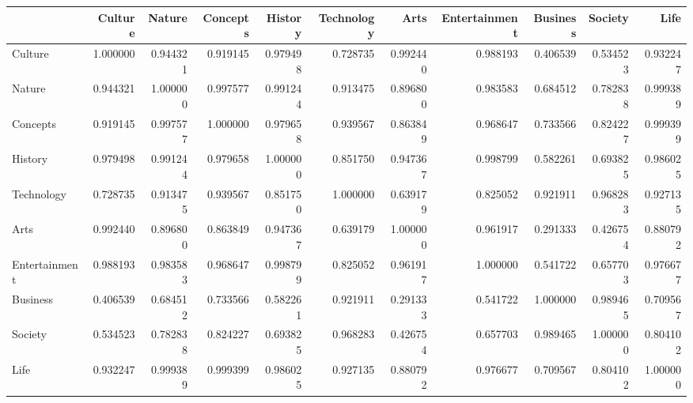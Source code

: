 \begin{tabular}{lrrrrrrrrrr}
\toprule
{} &   Culture &    Nature &  Concepts &   History &  Technology &      Arts &  Entertainment &  Business &   Society &      Life \\
\midrule
Culture       &  1.000000 &  0.944321 &  0.919145 &  0.979498 &    0.728735 &  0.992440 &       0.988193 &  0.406539 &  0.534523 &  0.932247 \\
Nature        &  0.944321 &  1.000000 &  0.997577 &  0.991244 &    0.913475 &  0.896800 &       0.983583 &  0.684512 &  0.782838 &  0.999389 \\
Concepts      &  0.919145 &  0.997577 &  1.000000 &  0.979658 &    0.939567 &  0.863849 &       0.968647 &  0.733566 &  0.824227 &  0.999399 \\
History       &  0.979498 &  0.991244 &  0.979658 &  1.000000 &    0.851750 &  0.947367 &       0.998799 &  0.582261 &  0.693825 &  0.986025 \\
Technology    &  0.728735 &  0.913475 &  0.939567 &  0.851750 &    1.000000 &  0.639179 &       0.825052 &  0.921911 &  0.968283 &  0.927135 \\
Arts          &  0.992440 &  0.896800 &  0.863849 &  0.947367 &    0.639179 &  1.000000 &       0.961917 &  0.291333 &  0.426754 &  0.880792 \\
Entertainment &  0.988193 &  0.983583 &  0.968647 &  0.998799 &    0.825052 &  0.961917 &       1.000000 &  0.541722 &  0.657703 &  0.976677 \\
Business      &  0.406539 &  0.684512 &  0.733566 &  0.582261 &    0.921911 &  0.291333 &       0.541722 &  1.000000 &  0.989465 &  0.709567 \\
Society       &  0.534523 &  0.782838 &  0.824227 &  0.693825 &    0.968283 &  0.426754 &       0.657703 &  0.989465 &  1.000000 &  0.804102 \\
Life          &  0.932247 &  0.999389 &  0.999399 &  0.986025 &    0.927135 &  0.880792 &       0.976677 &  0.709567 &  0.804102 &  1.000000 \\
\bottomrule
\end{tabular}
